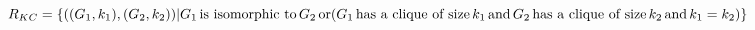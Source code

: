 




\begin{definition}
  $R_{KC}=\{((G_1, k_1), (G_2, k_2))| G_1 \,\text{is isomorphic to}\, G_2
  \,\text{or}\, \\(G_1 \,\text{has a clique of size}\, k_1 \,\text{and}\, G_2 \,\text{has
    a clique of size}\, k_2 \,\text{and}\, k_1=k_2)\}$
\end{definition}

